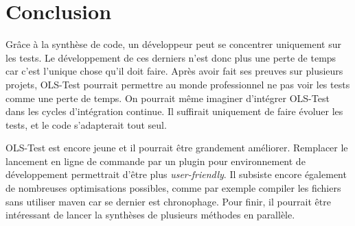 \chapter*{Conclusion}
	\thispagestyle{conclusion}
	
\par Grâce à la synthèse de code, un développeur peut se concentrer uniquement sur les tests. Le développement de ces derniers n'est donc plus une perte de temps car c'est l'unique chose qu'il doit faire. Après avoir fait ses preuves sur plusieurs projets, OLS-Test pourrait permettre au monde professionnel ne pas voir les tests comme une perte de temps. On pourrait même imaginer d'intégrer OLS-Test dans les cycles d'intégration continue. Il suffirait uniquement de faire évoluer les tests, et le code s'adapterait tout seul.

\par OLS-Test est encore jeune et il pourrait être grandement améliorer. Remplacer le lancement en ligne de commande par un plugin pour environnement de développement permettrait d'être plus \textit{user-friendly}. Il subsiste encore également de nombreuses optimisations possibles, comme par exemple compiler les fichiers sans utiliser maven car se dernier est chronophage. Pour finir, il pourrait être intéressant de lancer la synthèses de plusieurs méthodes en parallèle.

\begin{center}
\end{center}
	
	

